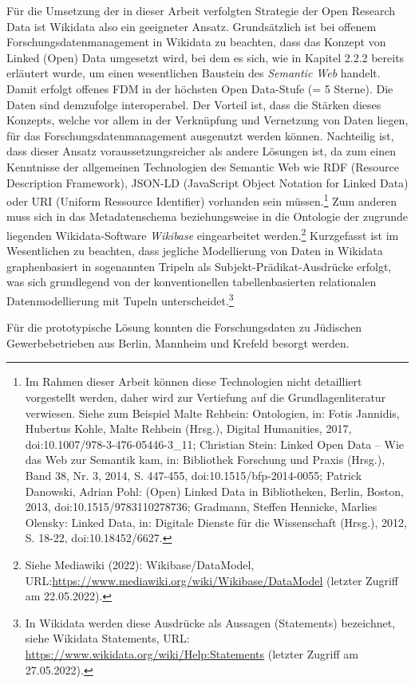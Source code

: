 Für die Umsetzung der in dieser Arbeit verfolgten Strategie der Open Research Data ist Wikidata also ein geeigneter Ansatz. Grundsätzlich ist bei offenem Forschungsdatenmanagement in Wikidata zu beachten, dass das Konzept von Linked (Open) Data umgesetzt wird, bei dem es sich, wie in Kapitel 2.2.2 bereits erläutert wurde, um einen wesentlichen Baustein des \textit{Semantic Web} handelt. Damit erfolgt offenes FDM in der höchsten Open Data-Stufe (= 5 Sterne). Die Daten sind demzufolge interoperabel. Der Vorteil ist, dass die Stärken dieses Konzepts, welche vor allem in der Verknüpfung und Vernetzung von Daten liegen, für das Forschungsdatenmanagement ausgenutzt werden können. Nachteilig ist, dass dieser Ansatz voraussetzungsreicher als andere Lösungen ist, da zum einen Kenntnisse der allgemeinen Technologien des Semantic Web wie RDF (Resource Description Framework), JSON-LD (JavaScript Object Notation for Linked Data) oder URI (Uniform Ressource Identifier) vorhanden sein müssen.\footnote{Im Rahmen dieser Arbeit können diese Technologien nicht detailliert vorgestellt werden, daher wird zur Vertiefung auf die Grundlagenliteratur verwiesen. Siehe zum Beispiel Malte Rehbein: Ontologien, in: Fotis Jannidis, Hubertus Kohle, Malte Rehbein (Hrsg.), Digital Humanities, 2017, doi:10.1007/978-3-476-05446-3\_11; Christian Stein: Linked Open Data – Wie das Web zur Semantik kam, in: Bibliothek Forschung und Praxis (Hrsg.), Band 38, Nr. 3, 2014, S. 447-455, doi:10.1515/bfp-2014-0055; Patrick Danowski, Adrian Pohl: (Open) Linked Data in Bibliotheken, Berlin, Boston, 2013, doi:10.1515/9783110278736; Gradmann, Steffen Hennicke, Marlies Olensky: Linked Data, in: Digitale Dienste für die Wissenschaft (Hrsg.), 2012, S. 18-22, doi:10.18452/6627.} Zum anderen muss sich in das Metadatenschema beziehungsweise in die Ontologie der zugrunde liegenden Wikidata-Software \textit{Wikibase} eingearbeitet werden.\footnote{Siehe Mediawiki (2022): Wikibase/DataModel, URL:\url{https://www.mediawiki.org/wiki/Wikibase/DataModel} (letzter Zugriff am 22.05.2022).} Kurzgefasst ist im Wesentlichen zu beachten, dass jegliche Modellierung von Daten in Wikidata graphenbasiert in sogenannten Tripeln als Subjekt-Prädikat-Ausdrücke erfolgt, was sich grundlegend von der konventionellen tabellenbasierten relationalen Datenmodellierung mit Tupeln unterscheidet.\footnote{In Wikidata werden diese Ausdrücke als Aussagen (Statements) bezeichnet, siehe Wikidata Statements, URL: \url{https://www.wikidata.org/wiki/Help:Statements} (letzter Zugriff am 27.05.2022).}

Für die prototypische Lösung konnten die Forschungsdaten zu Jüdischen Gewerbebetrieben aus Berlin, Mannheim und Krefeld besorgt werden.

